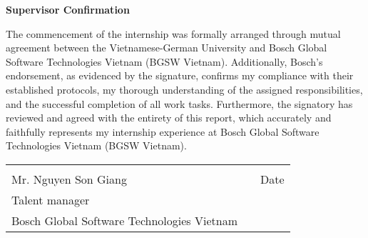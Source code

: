 \centerline{\LARGE \textbf{Supervisor Confirmation}}

\vspace{10mm}

The commencement of the internship was formally arranged through mutual agreement between the Vietnamese-German University and Bosch Global Software Technologies Vietnam (BGSW Vietnam). Additionally, Bosch’s endorsement, as evidenced by the signature, confirms my compliance with their established protocols, my thorough understanding of the assigned responsibilities, and the successful completion of all work tasks. Furthermore, the signatory has reviewed and agreed with the entirety of this report, which accurately and faithfully represents my internship experience at Bosch Global Software Technologies Vietnam (BGSW Vietnam).

\vfill

\begin{tabular}{@{}p{3.5in}p{0.1in}p{1.5in}@{}}
  \hrulefill & & \hrulefill \\
    Mr. Nguyen Son Giang & & Date \\
    Talent manager & & \\
    Bosch Global Software Technologies Vietnam & & \\
\end{tabular}